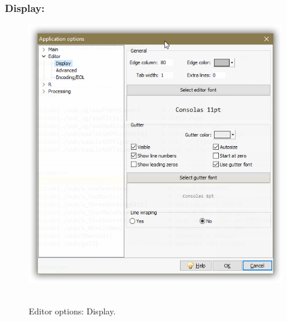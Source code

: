 \hypertarget{working_editor_display}{}
\subsubsection{Display:}

\begin{figure}[H]
  \includegraphics[scale=0.50]{./res/app_editor_display.png}~~
  \caption{Editor options: Display.}
  \label{fig:editor_display}
\end{figure}

